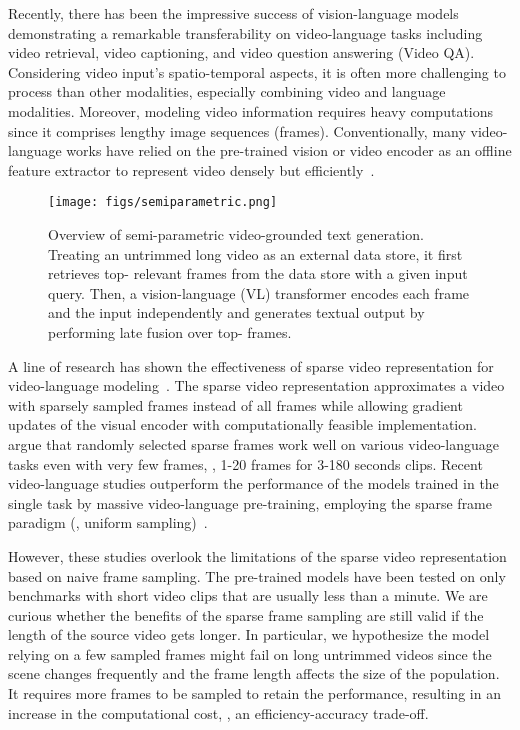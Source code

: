 \documentclass{article}
\begin{document}
Recently, there has been the impressive success of vision-language models~\cite{lu2019vilbert, radford2021learning, li2022blip, alayrac2022flamingo} demonstrating a remarkable transferability on video-language tasks including video retrieval, video captioning, and video question answering (Video QA). Considering video input's spatio-temporal aspects, it is often more challenging to process than other modalities, especially combining video and language modalities. Moreover, modeling video information requires heavy computations since it comprises lengthy image sequences (frames). Conventionally, many video-language works have relied on the pre-trained vision or video encoder as an offline feature extractor to represent video densely but efficiently~\cite{sun2019videobert, li2020hero, yang2021just}.

\begin{figure}[t!] 
\centering
\texttt{[image: figs/semiparametric.png]}
\caption{Overview of semi-parametric video-grounded text generation. Treating an untrimmed long video as an external data store, it first retrieves top- relevant frames from the data store with a given input query. Then, a vision-language (VL) transformer encodes each frame and the input independently and generates textual output by performing late fusion over top- frames.}
\label{fig:motivation}
\vspace{-2mm}
\end{figure}

A line of research has shown the effectiveness of sparse video representation for video-language modeling~\cite{lei2021less}. The sparse video representation approximates a video with sparsely sampled frames instead of all frames while allowing gradient updates of the visual encoder with computationally feasible implementation. \citet{lei2021less} argue that randomly selected sparse frames work well on various video-language tasks even with very few frames, \eg, 1-20 frames for 3-180 seconds clips. Recent video-language studies outperform the performance of the models trained in the single task by massive video-language pre-training, employing the sparse frame paradigm (\eg, uniform sampling)~\cite{zellers2021merlot, wang2022all, zellers2022merlot, yang2022zero}.


However, these studies overlook the limitations of the sparse video representation based on naive frame sampling. The pre-trained models have been tested on only benchmarks with short video clips that are usually less than a minute. We are curious whether the benefits of the sparse frame sampling are still valid if the length of the source video gets longer. In particular, we hypothesize the model relying on a few sampled frames might fail on long untrimmed videos since the scene changes frequently and the frame length affects the size of the population. It requires more frames to be sampled to retain the performance, resulting in an increase in the computational cost, \ie, an efficiency-accuracy trade-off.
\end{document}
